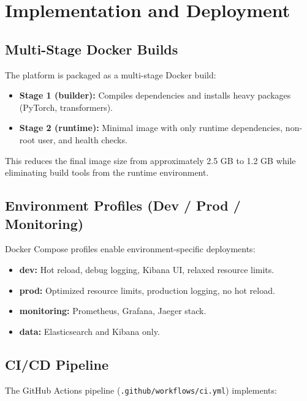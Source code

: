 \documentclass[11pt,a4paper]{article}
\begin{document}
\section{Implementation and Deployment}
\label{sec:implementation}

\subsection{Multi-Stage Docker Builds}
\label{subsec:docker}

The platform is packaged as a multi-stage Docker build:

\begin{itemize}[leftmargin=*]
  \item \textbf{Stage 1 (builder):} Compiles dependencies and installs heavy packages (PyTorch, transformers).
  \item \textbf{Stage 2 (runtime):} Minimal image with only runtime dependencies, non-root user, and health checks.
\end{itemize}

This reduces the final image size from approximately 2.5 GB to 1.2 GB while eliminating build tools from the runtime environment.

\subsection{Environment Profiles (Dev / Prod / Monitoring)}
\label{subsec:profiles}

Docker Compose profiles enable environment-specific deployments:

\begin{itemize}[leftmargin=*]
  \item \textbf{dev:} Hot reload, debug logging, Kibana UI, relaxed resource limits.
  \item \textbf{prod:} Optimized resource limits, production logging, no hot reload.
  \item \textbf{monitoring:} Prometheus, Grafana, Jaeger stack.
  \item \textbf{data:} Elasticsearch and Kibana only.
\end{itemize}

\subsection{CI/CD Pipeline}
\label{subsec:cicd}

The GitHub Actions pipeline (\texttt{.github/workflows/ci.yml}) implements:
\end{document}
